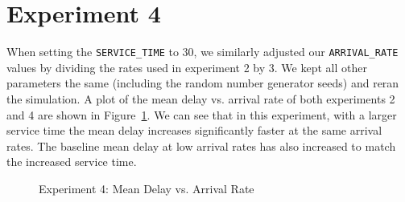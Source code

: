 \section*{Experiment 4}
When setting the \texttt{SERVICE\_TIME} to 30, we similarly adjusted our \texttt{ARRIVAL\_RATE} values by dividing the rates used in experiment 2 by 3. We kept all other parameters the same (including the random number generator seeds) and reran the simulation. A plot of the mean delay vs. arrival rate of both experiments 2 and 4 are shown in Figure~\ref{fig:exp4}. We can see that in this experiment, with a larger service time the mean delay increases significantly faster at the same arrival rates. The baseline mean delay at low arrival rates has also increased to match the increased service time.

\begin{figure}[h]
\centering
{}
\caption{Experiment 4: Mean Delay vs. Arrival Rate}
\label{fig:exp4}
\end{figure}